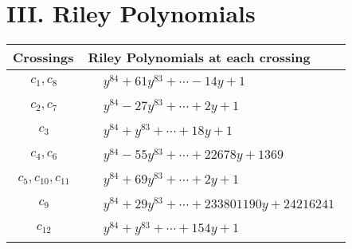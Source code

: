 \documentclass[1p]{elsarticle_modified}
\theoremstyle{definition}
\begin{document}
\centering \section*{ III. Riley Polynomials}
\begin{tabular}{m{50pt}|m{274pt}}
Crossings & \hspace{64pt}Riley Polynomials at each crossing \\
\hline $$\begin{aligned}c_{1},c_{8}\end{aligned}$$&$\begin{aligned}
&y^{84}+61 y^{83}+\cdots-14 y+1
\end{aligned}$\\
\hline $$\begin{aligned}c_{2},c_{7}\end{aligned}$$&$\begin{aligned}
&y^{84}-27 y^{83}+\cdots+2 y+1
\end{aligned}$\\
\hline $$\begin{aligned}c_{3}\end{aligned}$$&$\begin{aligned}
&y^{84}+y^{83}+\cdots+18 y+1
\end{aligned}$\\
\hline $$\begin{aligned}c_{4},c_{6}\end{aligned}$$&$\begin{aligned}
&y^{84}-55 y^{83}+\cdots+22678 y+1369
\end{aligned}$\\
\hline $$\begin{aligned}c_{5},c_{10},c_{11}\end{aligned}$$&$\begin{aligned}
&y^{84}+69 y^{83}+\cdots+2 y+1
\end{aligned}$\\
\hline $$\begin{aligned}c_{9}\end{aligned}$$&$\begin{aligned}
&y^{84}+29 y^{83}+\cdots+233801190 y+24216241
\end{aligned}$\\
\hline $$\begin{aligned}c_{12}\end{aligned}$$&$\begin{aligned}
&y^{84}+y^{83}+\cdots+154 y+1
\end{aligned}$\\
\hline
\end{tabular}
\vskip 2pc
\end{document}
